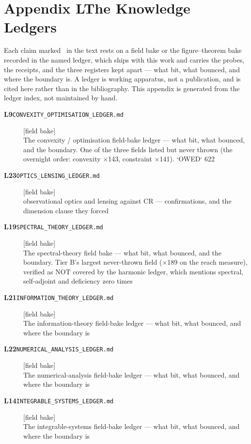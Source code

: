 \clearpage
\section*{Appendix L\quad The Knowledge Ledgers}\label{app:ledgers}
\small\noindent Each claim marked \ldgmarker\ in the text rests on a field bake or the figure--theorem bake recorded in the named ledger, which ships with this work and carries the probes, the receipts, and the three registers kept apart --- what bit, what bounced, and where the boundary is. A ledger is working apparatus, not a publication, and is cited here rather than in the bibliography. This appendix is generated from the ledger index, not maintained by hand.\par\medskip
\begingroup\renewcommand{\arraystretch}{1.25}
\begin{description}
\item[\textbf{L9}\quad\texttt{CONVEXITY\_OPTIMISATION\_LEDGER.md}]\hfill\textsf{[field bake]}\\
The convexity / optimisation field-bake ledger --- what bit, what bounced, and the boundary. One of the three fields listed but never thrown (the overnight order: convexity $\times$143, constraint $\times$141). `OWED` 622
\item[\textbf{L23}\quad\texttt{OPTICS\_LENSING\_LEDGER.md}]\hfill\textsf{[field bake]}\\
observational optics and lensing against CR --- confirmations, and the dimension clause they forced
\item[\textbf{L19}\quad\texttt{SPECTRAL\_THEORY\_LEDGER.md}]\hfill\textsf{[field bake]}\\
The spectral-theory field bake --- what bit, what bounced, and the boundary. Tier B's largest never-thrown field ($\times$189 on the reach measure), verified as NOT covered by the harmonic ledger, which mentions spectral, self-adjoint and deficiency zero times
\item[\textbf{L21}\quad\texttt{INFORMATION\_THEORY\_LEDGER.md}]\hfill\textsf{[field bake]}\\
The information-theory field-bake ledger --- what bit, what bounced, and where the boundary is
\item[\textbf{L22}\quad\texttt{NUMERICAL\_ANALYSIS\_LEDGER.md}]\hfill\textsf{[field bake]}\\
The numerical-analysis field-bake ledger --- what bit, what bounced, and where the boundary is
\item[\textbf{L14}\quad\texttt{INTEGRABLE\_SYSTEMS\_LEDGER.md}]\hfill\textsf{[field bake]}\\
The integrable-systems field-bake ledger --- what bit, what bounced, and where the boundary is
\end{description}
\endgroup
